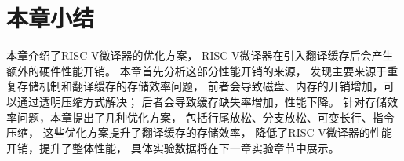 

\section{本章小结}

本章介绍了RISC-V微译器的优化方案，
RISC-V微译器在引入翻译缓存后会产生额外的硬件性能开销。
本章首先分析这部分性能开销的来源，
发现主要来源于重复存储机制和翻译缓存的存储效率问题，
前者会导致磁盘、内存的开销增加，可以通过透明压缩方式解决；
后者会导致缓存缺失率增加，性能下降。
针对存储效率问题，本章提出了几种优化方案，
包括行尾放松、分支放松、可变长行、指令压缩，
这些优化方案提升了翻译缓存的存储效率，
降低了RISC-V微译器的性能开销，提升了整体性能，
具体实验数据将在下一章实验章节中展示。